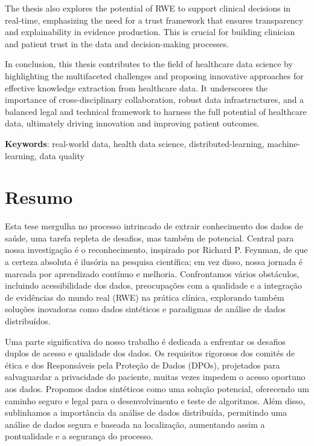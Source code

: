The thesis also explores the potential of RWE to support clinical decisions in real-time, emphasizing the need for a trust framework that ensures transparency and explainability in evidence production. This is crucial for building clinician and patient trust in the data and decision-making processes.

In conclusion, this thesis contributes to the field of healthcare data science by highlighting the multifaceted challenges and proposing innovative approaches for effective knowledge extraction from healthcare data. It underscores the importance of cross-disciplinary collaboration, robust data infrastructures, and a balanced legal and technical framework to harness the full potential of healthcare data, ultimately driving innovation and improving patient outcomes.

\vspace*{10mm}\noindent
\textbf{Keywords}: real-world data, health data science, distributed-learning, machine-learning, data quality

\chapter*{Resumo}

Esta tese mergulha no processo intrincado de extrair conhecimento dos dados de saúde, uma tarefa repleta de desafios, mas também de potencial. Central para nossa investigação é o reconhecimento, inspirado por Richard P. Feynman, de que a certeza absoluta é ilusória na pesquisa científica; em vez disso, nossa jornada é marcada por aprendizado contínuo e melhoria. Confrontamos vários obstáculos, incluindo acessibilidade dos dados, preocupações com a qualidade e a integração de evidências do mundo real (RWE) na prática clínica, explorando também soluções inovadoras como dados sintéticos e paradigmas de análise de dados distribuídos.

Uma parte significativa do nosso trabalho é dedicada a enfrentar os desafios duplos de acesso e qualidade dos dados. Os requisitos rigorosos dos comités de ética e dos Responsáveis pela Proteção de Dados (DPOs), projetados para salvaguardar a privacidade do paciente, muitas vezes impedem o acesso oportuno aos dados. Propomos dados sintéticos como uma solução potencial, oferecendo um caminho seguro e legal para o desenvolvimento e teste de algoritmos. Além disso, sublinhamos a importância da análise de dados distribuída, permitindo uma análise de dados segura e baseada na localização, aumentando assim a pontualidade e a segurança do processo.

